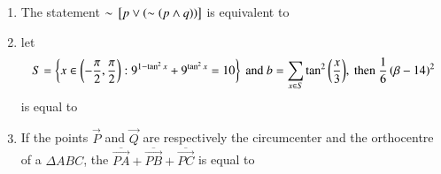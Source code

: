\documentclass[journal]{IEEEtran}
\numberwithin{equation}{enumi}
\numberwithin{figure}{enumi}
\begin{document}
\begin{enumerate}
    \item 
    The statement $\sim{}\left[p \lor \left(\sim \left(p \land q\right)\right)\right]$ is equivalent to

    \hfill{}

    \begin{enumerate}
    \end{enumerate}

    \item 
    let 
    \begin{align*}
        S = \left\{x \in \left(-\frac{\pi}{2}, \frac{\pi}{2}\right) : 9^{1-\tan^2 x} + 9^{\tan^2 x} = 10\right\} \text{ and } b = \sum_{x \in S} \tan^2 {\left(\frac{x}{3}\right)}, \text{ then } \frac{1}{6}\left(\beta -14\right)^2
   \end{align*}
    is equal to

    \hfill{}

    \begin{enumerate}
    \end{enumerate}

    \item
    If the points $\vec{P}$ and $\vec{Q}$ are respectively the circumcenter and the orthocentre of a $\Delta ABC$, the $\overline{\vec{PA}} + \overline{\vec{PB}} + \overline{\vec{PC}}$ is equal to

    \hfill{}

    \begin{enumerate}
    \end{enumerate}


\end{enumerate}
\end{document}
